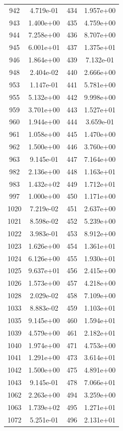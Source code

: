 \documentclass[12pt]{article}
\begin{document}
\begin{longtable}{@{}cccc@{}}
942 & 4.719e-01 & 434 & 1.957e+00 \\
943 & 1.400e+00 & 435 & 4.759e+00 \\
944 & 7.258e+00 & 436 & 8.707e+00 \\
945 & 6.001e+01 & 437 & 1.375e+01 \\
946 & 1.864e+00 & 439 & 7.132e-01 \\
948 & 2.404e-02 & 440 & 2.666e+00 \\
953 & 1.147e-01 & 441 & 5.781e+00 \\
955 & 5.132e+00 & 442 & 9.998e+00 \\
959 & 3.701e+00 & 443 & 1.527e+01 \\
960 & 1.944e+00 & 444 & 3.659e-01 \\
961 & 1.058e+00 & 445 & 1.470e+00 \\
962 & 1.500e+00 & 446 & 3.760e+00 \\
963 & 9.145e-01 & 447 & 7.164e+00 \\
982 & 2.136e+00 & 448 & 1.163e+01 \\
983 & 1.432e+02 & 449 & 1.712e+01 \\
997 & 1.000e+00 & 450 & 1.171e+00 \\
1020 & 7.219e-02 & 451 & 2.637e+00 \\
1021 & 8.598e-02 & 452 & 5.239e+00 \\
1022 & 3.983e-01 & 453 & 8.912e+00 \\
1023 & 1.626e+00 & 454 & 1.361e+01 \\
1024 & 6.126e+00 & 455 & 1.930e+01 \\
1025 & 9.637e+01 & 456 & 2.415e+00 \\
1026 & 1.573e+00 & 457 & 4.218e+00 \\
1028 & 2.029e-02 & 458 & 7.109e+00 \\
1033 & 8.883e-02 & 459 & 1.103e+01 \\
1035 & 9.145e+00 & 460 & 1.594e+01 \\
1039 & 4.579e+00 & 461 & 2.182e+01 \\
1040 & 1.974e+00 & 471 & 4.753e+00 \\
1041 & 1.291e+00 & 473 & 3.614e+01 \\
1042 & 1.500e+00 & 475 & 4.891e+00 \\
1043 & 9.145e-01 & 478 & 7.066e+01 \\
1062 & 2.263e+00 & 494 & 3.259e+00 \\
1063 & 1.739e+02 & 495 & 1.271e+01 \\
1072 & 5.251e-01 & 496 & 2.131e+01 \\

\end{longtable}
\end{document}
